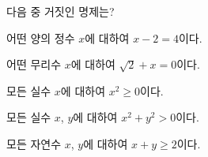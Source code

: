 다음 중 거짓인 명제는?
\begin{choicesv}{\rule[-3ex]{0pt}{8ex}어떤 양의 정수 $x$에 대하여 $x-2=4$이다.}{\rule[-3ex]{0pt}{8ex}어떤 무리수 $x$에 대하여 $\sqrt{2}+x=0$이다.}{\rule[-3ex]{0pt}{8ex}모든 실수 $x$에 대하여 $x^2\ge 0$이다.}{\rule[-3ex]{0pt}{8ex}모든 실수 $x$, $y$에 대하여 $x^2+y^2>0$이다.}{\rule[-3ex]{0pt}{8ex}모든 자연수 $x$, $y$에 대하여 $x+y\ge 2$이다.}\end{choicesv}
